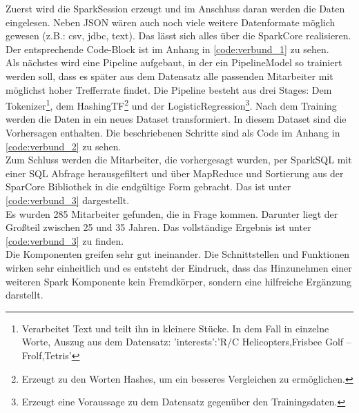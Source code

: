 \noindent
Zuerst wird die SparkSession erzeugt und im Anschluss daran werden die Daten eingelesen. Neben JSON wären auch noch viele weitere Datenformate möglich gewesen (z.B.: csv, jdbc, text). Das lässt sich alles über die SparkCore realisieren. Der entsprechende Code-Block ist im Anhang in \autoref{code:verbund_1} zu sehen.\\

\noindent
Als nächstes wird eine Pipeline aufgebaut, in der ein PipelineModel so trainiert werden soll, dass es später aus dem Datensatz alle passenden Mitarbeiter mit möglichst hoher Trefferrate findet. Die Pipeline besteht aus drei Stages: Dem Tokenizer\footnote{Verarbeitet Text und teilt ihn in kleinere Stücke. In dem Fall in einzelne Worte, Auszug aus dem Datensatz: 'interests':'R/C Helicopters,Frisbee Golf – Frolf,Tetris'}, dem HashingTF\footnote{Erzeugt zu den Worten Hashes, um ein besseres Vergleichen zu ermöglichen.} und der LogisticRegression\footnote{Erzeugt eine Voraussage zu dem Datensatz gegenüber den Trainingsdaten.}. Nach dem Training werden die Daten in ein neues Dataset transformiert. In diesem Dataset sind die Vorhersagen enthalten. Die beschriebenen Schritte sind als Code im Anhang in \autoref{code:verbund_2} zu sehen. \\

\noindent
Zum Schluss werden die Mitarbeiter, die vorhergesagt wurden, per SparkSQL mit einer SQL Abfrage herausgefiltert und über MapReduce und Sortierung aus der SparCore Bibliothek in die endgültige Form gebracht. Das ist unter \autoref{code:verbund_3} dargestellt. \\

\noindent
Es wurden 285 Mitarbeiter gefunden, die in Frage kommen. Darunter liegt der Großteil zwischen 25 und 35 Jahren. Das vollständige Ergebnis ist unter \autoref{code:verbund_3} zu finden.\\

\noindent
Die Komponenten greifen sehr gut ineinander. Die Schnittstellen und Funktionen wirken sehr einheitlich und es entsteht der Eindruck, dass das Hinzunehmen einer weiteren Spark Komponente kein Fremdkörper, sondern eine hilfreiche Ergänzung darstellt.

 








